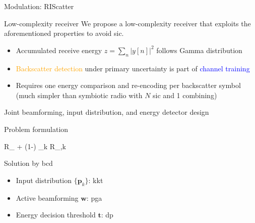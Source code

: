 \documentclass[presentation,xcolor={table},9pt]{beamer}
\begin{document}
\begin{section}{Modulation: RIScatter}
	\begin{frame}{Low-complexity receiver}
		We propose a low-complexity receiver that exploits the aforementioned properties to avoid \gls{sic}.
		\begin{figure}[!t]
			\centering
			\subfloat{
				\resizebox{0.42\linewidth}{!}{
					
				}
			}
			\subfloat{
				\resizebox{0.58\linewidth}{!}{
					
				}
			}
			\label{fg:receiver}
		\end{figure}
		\vspace{0.5cm}
		\begin{itemize}
			\item Accumulated receive energy $z=\sum_{n} \bigl\lvert y[n] \bigr\rvert^2$ follows Gamma distribution
			\item \textcolor{orange}{Backscatter detection} under primary uncertainty is part of \textcolor{blue}{channel training}
			\item Requires one energy comparison and re-encoding per backscatter symbol (much simpler than symbiotic radio with $N$ \gls{sic} and 1 combining)
		\end{itemize}
	\end{frame}

	\begin{frame}{Joint beamforming, input distribution, and energy detector design}
		\begin{block}{Problem formulation}
			\vspace{-0.25cm}
			\begin{maxi*}
				{}{\rho R_ + (1-\rho) \sum\nolimits_{k} R_{,k}}{}{}
			\end{maxi*}
		\end{block}
		\begin{exampleblock}{Solution by \gls{bcd}}
			\begin{itemize}
				\item Input distribution $\{\mathbf{p}_k\}$: \gls{kkt}
				\item Active beamforming $\mathbf{w}$: \gls{pga}
				\item Energy decision threshold $\mathbf{t}$: \gls{dp}
			\end{itemize}
		\end{exampleblock}
	\end{frame}


\end{section}
\end{document}
